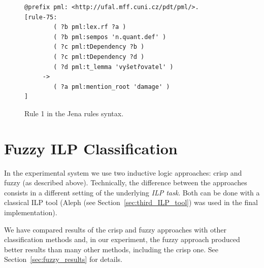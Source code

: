 \begin{figure}[b!]
\begin{verbatim}
@prefix pml: <http://ufal.mff.cuni.cz/pdt/pml/>.
[rule-75:  
        ( ?b pml:lex.rf ?a )
        ( ?b pml:sempos 'n.quant.def' )
        ( ?c pml:tDependency ?b )
        ( ?c pml:tDependency ?d )
        ( ?d pml:t_lemma 'vyšetřovatel' )
     -> 
        ( ?a pml:mention_root 'damage' )
]
\end{verbatim}
\caption{Rule 1 in the Jena rules syntax.}
\label{fig:rules_jena}
\end{figure}


\clearpage










\section{Fuzzy ILP Classification}

In the experimental system we use two inductive logic approaches: crisp and fuzzy (as described above). Technically, the difference between the approaches consists in a different setting of the underlying \emph{ILP task}. Both can be done with a classical ILP tool (Aleph (see Section~\ref{sec:third_ILP_tool}) was used in the final implementation).

We have compared results of the crisp and fuzzy approaches with other classification methods and, in our experiment, the fuzzy approach produced better results than many other methods, including the crisp one. See Section~\ref{sec:fuzzy_results} for details.



